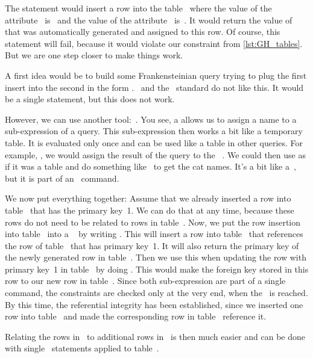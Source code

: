 The statement  would insert a row into the table~ where the value of the attribute~ is~ and the value of the attribute~ is~.
It would return the value of~ that was automatically generated and assigned to this row.
Of course, this statement will fail, because it would violate our constraint  from \cref{lst:GH_tables}.
But we are one step closer to make things work.

A first idea would be to build some Frankensteinian query trying to plug the first insert into the second in the
 form  \linebreak[3].
\postgresql\ and the \sql\ standard do not like this.
It would be a single statement, but this does not work.

However, we can use another tool:~.
You see, a  allows us to assign a name to a sub-expression of a query.
This sub-expression then works a bit like a temporary table.
It is evaluated only once and can be used like a table in other queries.
For example, , we would assign the result of the query  to the ~.
We could then use  as if it was a table and do something like~ to get the cat names.
It's a bit like a~, but it is part of an \sql\ command.%
%
\begin{sloppypar}%
We now put everything together:
Assume that we already inserted a row into table~ that has the primary key~1.
We can do that at any time, because these rows do not need to be related to rows in table~.
Now, we put the row insertion into table~ into a ~ by writing .
This  will insert a row into table~ that references the row of table~ that has primary key~1.
It will also return the primary key of the newly generated row in table~.
Then we use this  when updating the row with primary key~1 in table~ by doing .
This would make the foreign key stored in this row to our new row in table~.
Since both sub-expression are part of a single command, the constraints are checked only at the very end, when  the~\sqlil{;} is reached.
By this time, the referential integrity has been established, since we inserted one row into table~ and made the corresponding row in table~ reference it.%
\end{sloppypar}%
%
Relating the rows in~ to additional rows in~ is then much easier and can be done with single ~statements applied to table~.

